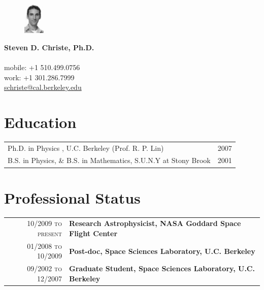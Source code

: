 \documentclass[11pt]{article}
\makeatletter
\newcommand{\name}[1]{\LARGE\textbf{#1}}
\newcommand{\address}[1]{\small{\color{lgray}{#1}}}
\newcommand{\tel}[1]{\small{#1}}
\newcommand{\email}[1]{\href{mailto:#1}{\small{#1}}}
\newcommand{\web}[2]{\href{#1}{\small{#2}}}
\newenvironment{ftabular}[1]
{\begin{tabular*}{0.95\textwidth}{@{\extracolsep{\fill}}#1}}
{\end{tabular*}}
\makeatother
\begin{document}
\vspace{-2.5in}
\begin{figure}
\includegraphics[width=0.09\textwidth]{mugshot.jpg}
\end{figure}


\name{Steven D. Christe, Ph.D.} \\
\address{Solar Physics Laboratory, Heliophysics Division \\
NASA Goddard Space Flight Center, Greenbelt, MD} \\
\tel{mobile: +1 510.499.0756}\\
\tel{work: +1 301.286.7999} \\
\email{schriste@cal.berkeley.edu}

\section{Education}
\begin{ftabular}{lr}
Ph.D. in Physics , U.C. Berkeley (Prof. R. P. Lin) & \textsc{2007}\\
B.S. in Physics, \& B.S. in Mathematics, S.U.N.Y at Stony Brook & \textsc{2001}\\
\end{ftabular}

\section{Professional Status}
\begin{ftabular}{r|p{14cm}}
\textsc{10/2009 to present} & \textbf{Research Astrophysicist, NASA Goddard Space Flight Center} \\


\textsc{01/2008 to 10/2009} & \textbf{Post-doc, Space Sciences Laboratory, U.C. Berkeley}\\


\textsc{09/2002 to 12/2007} & \textbf{Graduate Student, Space Sciences Laboratory, U.C. Berkeley}\end{ftabular}
\end{document}
